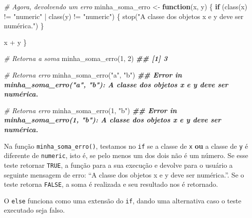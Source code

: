 \documentclass[
]{book}
\newenvironment{Shaded}{\begin{snugshade}}{\end{snugshade}}
\newcommand{\CommentTok}[1]{\textcolor[rgb]{0.56,0.35,0.01}{\textit{#1}}}
\newcommand{\ControlFlowTok}[1]{\textcolor[rgb]{0.13,0.29,0.53}{\textbf{#1}}}
\newcommand{\DecValTok}[1]{\textcolor[rgb]{0.00,0.00,0.81}{#1}}
\newcommand{\DocumentationTok}[1]{\textcolor[rgb]{0.56,0.35,0.01}{\textbf{\textit{#1}}}}
\newcommand{\FunctionTok}[1]{\textcolor[rgb]{0.00,0.00,0.00}{#1}}
\newcommand{\NormalTok}[1]{#1}
\newcommand{\OtherTok}[1]{\textcolor[rgb]{0.56,0.35,0.01}{#1}}
\newcommand{\SpecialCharTok}[1]{\textcolor[rgb]{0.00,0.00,0.00}{#1}}
\newcommand{\StringTok}[1]{\textcolor[rgb]{0.31,0.60,0.02}{#1}}
\begin{document}
\begin{Shaded}
\begin{Highlighting}[]
\CommentTok{\# Agora, devolvendo um erro}
\NormalTok{minha\_soma\_erro }\OtherTok{\textless{}{-}} \ControlFlowTok{function}\NormalTok{(x, y) \{}
  \ControlFlowTok{if}\NormalTok{ (}\FunctionTok{class}\NormalTok{(x) }\SpecialCharTok{!=} \StringTok{"numeric"} \SpecialCharTok{|} \FunctionTok{class}\NormalTok{(y) }\SpecialCharTok{!=} \StringTok{"numeric"}\NormalTok{) \{}
    \FunctionTok{stop}\NormalTok{(}\StringTok{"A classe dos objetos x e y deve ser numérica."}\NormalTok{)}
\NormalTok{  \}}
  
\NormalTok{  x }\SpecialCharTok{+}\NormalTok{ y}
\NormalTok{\}}

\CommentTok{\# Retorna a soma}
\FunctionTok{minha\_soma\_erro}\NormalTok{(}\DecValTok{1}\NormalTok{, }\DecValTok{2}\NormalTok{)}
\DocumentationTok{\#\# [1] 3}

\CommentTok{\# Retorna erro}
\FunctionTok{minha\_soma\_erro}\NormalTok{(}\StringTok{"a"}\NormalTok{, }\StringTok{"b"}\NormalTok{)}
\DocumentationTok{\#\# Error in minha\_soma\_erro("a", "b"): A classe dos objetos x e y deve ser numérica.}

\CommentTok{\# Retorna erro}
\FunctionTok{minha\_soma\_erro}\NormalTok{(}\DecValTok{1}\NormalTok{, }\StringTok{"b"}\NormalTok{)}
\DocumentationTok{\#\# Error in minha\_soma\_erro(1, "b"): A classe dos objetos x e y deve ser numérica.}
\end{Highlighting}
\end{Shaded}

Na função \texttt{minha\_soma\_erro()}, testamos no \texttt{if} se a classe de \texttt{x} \textbf{ou} a classe de \texttt{y} é diferente de \texttt{numeric}, isto é, se pelo menos um dos dois não é um número. Se esse teste retornar \texttt{TRUE}, a função para a sua execução e devolve para o usuário a seguinte mensagem de erro: ``A classe dos objetos x e y deve ser numérica.''. Se o teste retorna \texttt{FALSE}, a soma é realizada e seu resultado nos é retornado.

O \texttt{else} funciona como uma extensão do \texttt{if}, dando uma alternativa caso o teste executado seja falso.
\end{document}
